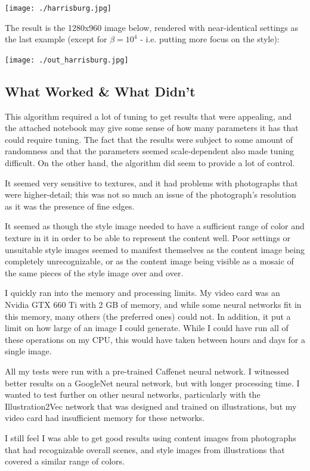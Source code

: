 \documentclass{article}
\begin{document}
\texttt{[image: ./harrisburg.jpg]}

The result is the 1280x960 image below, rendered with near-identical
settings as the last example (except for $\beta=10^4$ - i.e. putting
more focus on the style):

\texttt{[image: ./out\_harrisburg.jpg]}

\subsection{What Worked \& What Didn't}

This algorithm required a lot of tuning to get results that were
appealing, and the attached notebook may give some sense of how many
parameters it has that could require tuning.  The fact that the
results were subject to some amount of randomness and that the
parameters seemed scale-dependent also made tuning difficult.  On the
other hand, the algorithm did seem to provide a lot of control.

It seemed very sensitive to textures, and it had problems with
photographs that were higher-detail; this was not so much an issue of
the photograph's resolution as it was the presence of fine edges.

It seemed as though the style image needed to have a sufficient range
of color and texture in it in order to be able to represent the
content well.  Poor settings or unsuitable style images seemed to
manifest themselves as the content image being completely
unrecognizable, or as the content image being visible as a mosaic of
the same pieces of the style image over and over.

I quickly ran into the memory and processing limits.  My video card
was an Nvidia GTX 660 Ti with 2 GB of memory, and while some neural
networks fit in this memory, many others (the preferred ones) could
not.  In addition, it put a limit on how large of an image I could
generate.  While I could have run all of these operations on my CPU,
this would have taken between hours and days for a single image.

All my tests were run with a pre-trained Caffenet neural network.  I
witnessed better results on a GoogleNet neural network, but with
longer processing time.  I wanted to test further on other neural
networks, particularly with the Illustration2Vec network that was
designed and trained on illustrations\cite{Saito2015}, but my video
card had insufficient memory for these networks.

I still feel I was able to get good results using content images from
photographs that had recognizable overall scenes, and style images
from illustrations that covered a similar range of colors.
\end{document}

